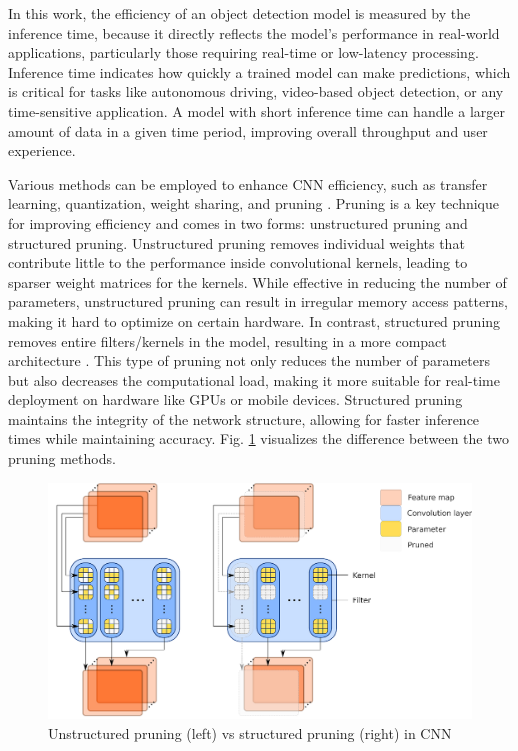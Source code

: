 \documentclass[journal,onecolumn,12pt]{IEEEtran}
\begin{document}
In this work, the efficiency of an object detection model is measured by the inference time, because it directly reflects the model’s performance in real-world applications, particularly those requiring real-time or low-latency processing. Inference time indicates how quickly a trained model can make predictions, which is critical for tasks like autonomous driving, video-based object detection, or any time-sensitive application. A model with short inference time can handle a larger amount of data in a given time period, improving overall throughput and user experience.

Various methods can be employed to enhance CNN efficiency, such as transfer learning, quantization, weight sharing, and pruning \cite{HABIB20224244}. Pruning is a key technique for improving efficiency and comes in two forms: unstructured pruning and structured pruning. Unstructured pruning removes individual weights that contribute little to the performance inside convolutional kernels, leading to sparser weight matrices for the kernels. While effective in reducing the number of parameters, unstructured pruning can result in irregular memory access patterns, making it hard to optimize on certain hardware. In contrast, structured pruning removes entire filters/kernels in the model, resulting in a more compact architecture \cite{beforehydra}. This type of pruning not only reduces the number of parameters but also decreases the computational load, making it more suitable for real-time deployment on hardware like GPUs or mobile devices. Structured pruning maintains the integrity of the network structure, allowing for faster inference times while maintaining accuracy. Fig. \ref{fig:pruning} visualizes the difference between the two pruning methods.

\begin{figure}
    \centering
    \captionsetup{justification=centering}
    \includegraphics[width=0.6\linewidth]{figures/pruning.PNG}
    \caption{Unstructured pruning (left) vs structured pruning (right) in CNN \cite{Tessier_2021}}
    \label{fig:pruning}
\end{figure}
\end{document}
